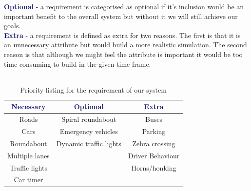 \documentclass{article}
\begin{document}
\noindent
\textcolor{MidnightBlue}{\bf Optional} - a requirement is categorised as optional if it's inclusion would be an important benefit to the overall system but without it we will still achieve our goals.\\

\noindent
\textcolor{MidnightBlue}{\bf Extra} - a requirement is defined as extra for two reasons. 
The first is that it is an unnecessary attribute but would build a more realistic simulation. 
The second reason is that although we might feel the attribute is important it would be too time consuming to build in the given time frame.\\\\




\begin{table}[H] 
	\centering
	\label{PriorityListing}
	\begin{tabular}{|c|c|c|}
		\hline \rule{0pt}{2.5ex}
		\textcolor{MidnightBlue}{\bf Necessary}      & \textcolor{MidnightBlue}{\bf Optional} & \textcolor{MidnightBlue}{\bf Extra}   \\ \hline \rule{0pt}{2.5ex}
		Roads & Spiral roundabout & Buses  \\ 
		Cars & Emergency vehicles & Parking \\ 
		Roundabout & Dynamic traffic lights & Zebra crossing \\ 
		Multiple lanes & & Driver Behaviour  \\
		Traffic lights & & Horns/honking \\
		Car timer  & & \\ \hline 
	\end{tabular}
	\caption{Priority listing for the requirement of our system}
	\label{requirements}
	
\end{table}
\end{document}
